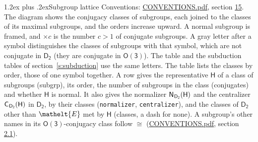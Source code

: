 \documentclass[10pt,a4paper]{article}
\makeatletter
\renewcommand\section{\@startsection{section}{1}{\z@}{-3ex plus -1ex minus -.2ex}%
  {1.2ex plus .2ex}{\normalfont\large\sffamily\bfseries\color{parttitle}}}
\numberwithin{equation}{section}
\newcommand{\eltfont}[1]{{\let\sigma\eltsigma\mathelt{#1}}}
\newcommand{\grp}[1]{\mathsf{#1}}
\newcommand{\cls}[1]{\eltfont{#1}}
\newcommand{\samecls}{\cong}
\newcommand{\clsletter}[1]{\,{\scriptsize\color{black!55}#1}}
\newcommand{\hairsp}{\mkern1mu}
\makeatother
\begin{document}
\section{Subgroup lattice}\label{s:subgroups}
Conventions: \href{../../CONVENTIONS.pdf}{CONVENTIONS.pdf}, section \href{../../CONVENTIONS.pdf\#conv.15}{15}.
The diagram shows the conjugacy classes of subgroups, each joined to the classes of its maximal subgroups, and the orders increase upward. \label{n:index.conjugates.c}A normal subgroup is framed, and ${\times}c$ is the number $c > 1$ of conjugate subgroups. A gray letter after a symbol distinguishes the classes of subgroups with that symbol, which are not conjugate in $\grp{D_{2}}$ (they are conjugate in \href{O3.pdf}{$\grp{O(3)}$}). The table and the subduction tables of section~\ref{s:subduction} use the same letters. The table lists the classes by order, those of one symbol together. \label{n:group.H}\label{n:head.subgroup}\label{n:head.order}\label{n:head.conjugates}\label{n:head.normal}A row gives the representative $\grp{H}$ of a class of subgroups (subgrp), its order, the number of subgroups in the class (conjugates) and whether $\grp{H}$ is normal. \label{n:group.normalizer}\label{n:group.centralizer}\label{n:head.classes}It also gives the normalizer $\grp{N}_{\hairsp \grp{D_{2}}}(\grp{H})$ and the centralizer $\grp{C}_{\hairsp \grp{D_{2}}}(\grp{H})$ in $\grp{D_{2}}$, by their classes (\texttt{normalizer}, \texttt{centralizer}), and the classes of $\grp{D_{2}}$ other than $\cls{E}$ met by $\grp{H}$ (classes, a dash for none). A subgroup's other names in its \href{O3.pdf}{$\grp{O(3)}$}-conjugacy class follow $\samecls$ (\href{../../CONVENTIONS.pdf}{CONVENTIONS.pdf}, section \href{../../CONVENTIONS.pdf\#conv.2.1}{2.1}).
\begin{center}
\end{center}
\end{document}
